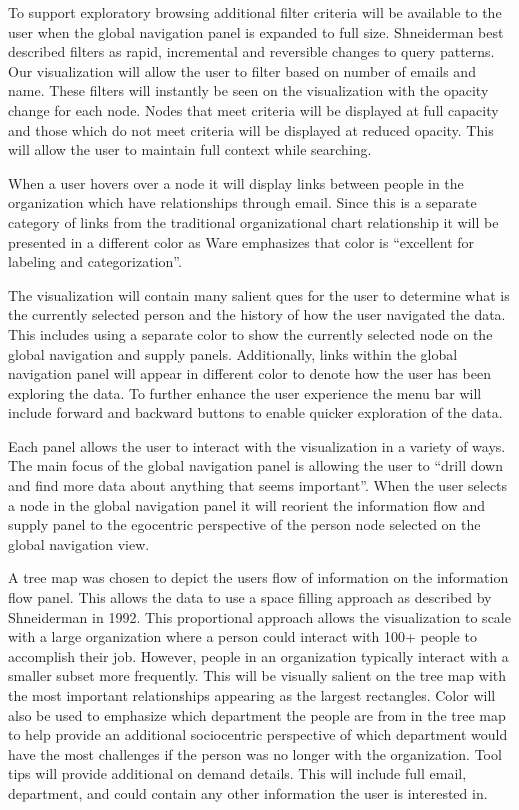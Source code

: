 \documentclass{soups}
\begin{document}
To support exploratory browsing\cite{ahlberg1994visual} additional filter criteria will be available to the user when the global navigation panel is expanded to full size.  Shneiderman best described filters as rapid, incremental and reversible changes to query patterns\cite{ahlberg1994visual}.  Our visualization will allow the user to filter based on number of emails and name.  These filters will instantly be seen on the visualization with the opacity change for each node.  Nodes that meet criteria will be displayed at full capacity and those which do not meet criteria will be displayed at reduced opacity.  This will allow the user to maintain full context while searching.

When a user hovers over a node it will display links between people in the organization which have relationships through email.  Since this is a separate category of links from the traditional organizational chart relationship it will be presented in a different color as Ware emphasizes that color is “excellent for labeling and categorization”\cite{ware2012information}.

The visualization will contain many salient\cite{ware2012information} ques for the user to determine what is the currently selected person and the history of how the user navigated the data.  This includes using a separate color to show the currently selected node on the global navigation and supply panels.  Additionally, links within the global navigation panel will appear in different color to denote how the user has been exploring the data.  To further enhance the user experience the menu bar will include forward and backward buttons to enable quicker exploration of the data.

Each panel allows the user to interact with the visualization in a variety of ways.  The main focus of the global navigation panel is allowing the user to “drill down and find more data about anything that seems important”\cite{ware2012information}.  When the user selects a node in the global navigation panel it will reorient the information flow and supply panel to the egocentric perspective of the person node selected on the global navigation view.

A tree map was chosen to depict the users flow of information on the information flow panel.  This allows the data to use a space filling approach as described by Shneiderman in 1992\cite{shneiderman1992tree}.  This proportional approach allows the visualization to scale with a large organization where a person could interact with 100+ people to accomplish their job.  However, people in an organization typically interact with a smaller subset more frequently.  This will be visually salient\cite{ware2012information} on the tree map with the most important relationships appearing as the largest rectangles.  Color will also be used to emphasize\cite{ware2012information} which department the people are from in the tree map to help provide an additional sociocentric perspective of which department would have the most challenges if the person was no longer with the organization.  Tool tips will provide additional on demand details\cite{anafigueiras}.  This will include full email, department, and could contain any other information the user is interested in.
\end{document}
